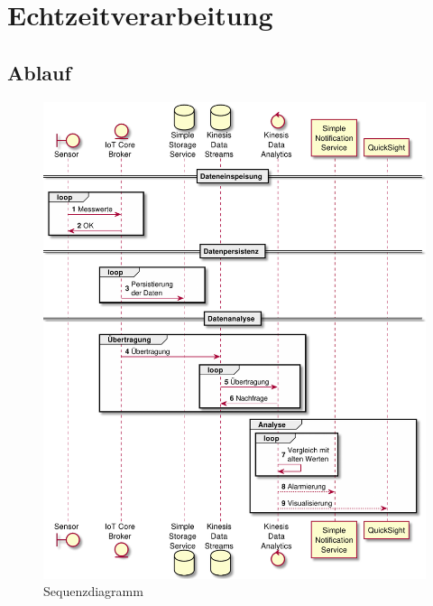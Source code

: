 \section{Echtzeitverarbeitung}
\subsection{Ablauf}
\begin{figure}[H]
\centering
\includegraphics[width=\textwidth]{graphics/echtzeit-ra.pdf}
\caption{Sequenzdiagramm}
\label{abb:SequenceEchtzeitRA}
\end{figure}

